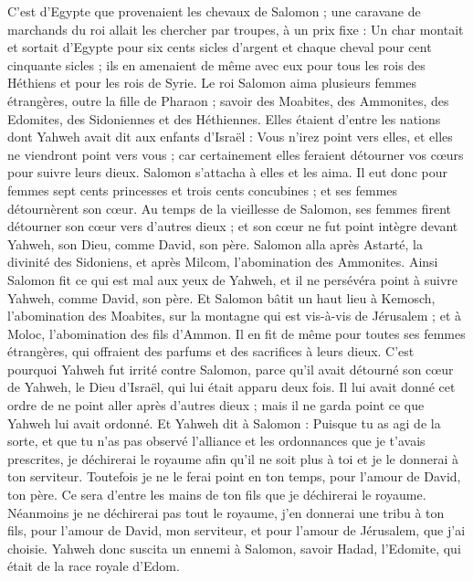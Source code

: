 \begin{multicols}{2}
C’est d’Egypte que provenaient les chevaux de Salomon ; une caravane de marchands du roi allait les chercher par troupes, à un prix fixe :
Un char montait et sortait d'Egypte pour six cents sicles d'argent et chaque cheval pour cent cinquante sicles ; ils en amenaient de même avec eux pour tous les rois des Héthiens et pour les rois de Syrie.
\VerseOne{}Le roi Salomon aima plusieurs femmes étrangères, outre la fille de Pharaon ; savoir des Moabites, des Ammonites, des Edomites, des Sidoniennes et des Héthiennes.
Elles étaient d'entre les nations dont Yahweh avait dit aux enfants d'Israël : Vous n'irez point vers elles, et elles ne viendront point vers vous ; car certainement elles feraient détourner vos cœurs pour suivre leurs dieux. Salomon s'attacha à elles et les aima.
Il eut donc pour femmes sept cents princesses et trois cents concubines ; et ses femmes détournèrent son cœur.
Au temps de la vieillesse de Salomon, ses femmes firent détourner son cœur vers d'autres dieux ; et son cœur ne fut point intègre devant Yahweh, son Dieu, comme David, son père.
Salomon alla après Astarté, la divinité des Sidoniens, et après Milcom, l'abomination des Ammonites.
Ainsi Salomon fit ce qui est mal aux yeux de Yahweh, et il ne persévéra point à suivre Yahweh, comme David, son père.
Et Salomon bâtit un haut lieu à Kemosch, l'abomination des Moabites, sur la montagne qui est vis-à-vis de Jérusalem ; et à Moloc, l'abomination des fils d’Ammon.
Il en fit de même pour toutes ses femmes étrangères, qui offraient des parfums et des sacrifices à leurs dieux.
C'est pourquoi Yahweh fut irrité contre Salomon, parce qu'il avait détourné son cœur de Yahweh, le Dieu d'Israël, qui lui était apparu deux fois.
Il lui avait donné cet ordre de ne point aller après d'autres dieux ; mais il ne garda point ce que Yahweh lui avait ordonné.
Et Yahweh dit à Salomon : Puisque tu as agi de la sorte, et que tu n'as pas observé l’alliance et les ordonnances que je t'avais prescrites, je déchirerai le royaume afin qu'il ne soit plus à toi et je le donnerai à ton serviteur.
Toutefois je ne le ferai point en ton temps, pour l’amour de David, ton père. Ce sera d'entre les mains de ton fils que je déchirerai le royaume.
Néanmoins je ne déchirerai pas tout le royaume, j'en donnerai une tribu à ton fils, pour l'amour de David, mon serviteur, et pour l'amour de Jérusalem, que j'ai choisie.
Yahweh donc suscita un ennemi à Salomon, savoir Hadad, l’Edomite, qui était de la race royale d'Edom.

\end{multicols}

